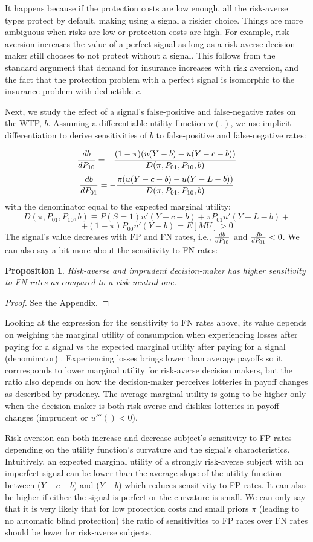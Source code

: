 \documentclass[12pt,a4paper]{article}
\newtheorem{theorem}{Proposition}
\begin{document}
It happens because if the protection costs are low enough, all the risk-averse types protect by default, making using a signal a riskier choice. Things are more ambiguous when risks are low or protection costs are high. For example, risk aversion increases the value of a perfect signal as long as a risk-averse decision-maker still chooses to not protect without a signal. This follows from the standard argument that demand for insurance increases with risk aversion, and the fact that the protection problem with a perfect signal is isomorphic to the insurance problem with deductible $c$. 

Next, we study the effect of a signal's false-positive and false-negative rates on the WTP, $b$. Assuming a differentiable utility function $u(.)$, we use implicit differentiation to derive sensitivities of $b$ to false-positive and false-negative rates:

$${db\over dP_{10}}=-{(1-\pi)(u(Y-b)-u(Y-c-b))\over D(\pi, P_{01}, P_{10}, b)}$$
$${db\over dP_{01}}=-{\pi(u(Y-c-b)-u(Y-L-b))\over D(\pi, P_{01}, P_{10}, b)}$$
with the denominator equal to the expected marginal utility:
$$D(\pi, P_{01}, P_{10}, b)\equiv P(S=1)u'(Y-c-b)+\pi P_{01}u'(Y-L-b)+$$
$$+(1-\pi)P_{00}u'(Y-b)=E[MU]>0$$
The signal's value decreases with FP and FN rates, i.e., ${db\over dP_{10}}$ and ${db\over dP_{01}}<0$. We can also say a bit more about the sensitivity to FN rates:
\begin{theorem}
Risk-averse and imprudent decision-maker has higher sensitivity to FN rates as compared to a risk-neutral one.
\end{theorem}\label{thm:riskAverse}  
\begin{proof}
See the Appendix.
\end{proof}
Looking at the expression for the sensitivity to FN rates above, its value depends on weighing the marginal utility of consumption when experiencing losses after paying for a signal vs the expected marginal utility after paying for a signal (denominator) . Experiencing losses brings lower than average payoffs so it corrresponds to lower marginal utility for risk-averse decision makers, but the ratio also depends on how the decision-maker perceives lotteries in payoff changes as described by prudency. The average marginal utility is going to be higher only when the decision-maker is both risk-averse and dislikes lotteries in payoff changes (imprudent or $u'''()<0$). 

Risk aversion can both increase and decrease subject's sensitivity to FP rates depending on the utility function's curvature and the signal's characteristics. Intuitively, an expected marginal utility of a strongly risk-averse subject with an imperfect signal can be lower than the average slope of the utility function between ($Y-c-b$) and ($Y-b$) which reduces sensitivity to FP rates. It can also be higher if either the signal is perfect or the curvature is small. We can only say that it is very likely that for low protection costs and small priors $\pi$ (leading to no automatic blind protection) the ratio of sensitivities to FP rates over FN rates should be lower for risk-averse subjects. 
\end{document}
